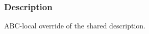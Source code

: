 \begin{frame}
  \frametitle{Description}
  ABC-local override of the shared description.
\end{frame}
